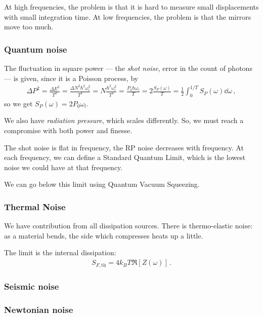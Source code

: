 \documentclass[main.tex]{subfiles}
\begin{document}
At high frequencies, the problem is that it is hard to measure small displacements with small integration time. 
At low frequencies, the problem is that the mirrors move too much. 

\subsubsection{Quantum noise}

The fluctuation in square power --- the \emph{shot noise}, error in the count of photons ---  is given, since it is a Poisson process, by
%
\begin{align}
\Delta P^2 = \frac{\Delta E^2}{T^2} = 
\frac{\Delta N^2 \hbar^2 \omega_{l}^2}{T^2}
= N \frac{\hbar^2   \omega_{l}^2}{T^2}
= \frac{P_0 \hbar \omega_{l}}{T}
= 2\frac{S_P(\omega )}{T}
= \frac{1}{2} \int_{0}^{1/T} S_P (\omega) \dd{\omega }
\,,
\end{align}
%
so we get \(S_P (\omega ) = 2 P_0 \omega_{l}\). 

We also have \emph{radiation pressure}, which scales differently. 
So, we must reach a compromise with both power and finesse. 

The shot noise is flat in frequency, the RP noise decreases with frequency. 
At each frequency, we can define a Standard Quantum Limit, which is the lowest noise we could have at that frequency. 

We can go below this limit using Quantum Vacuum Squeezing. 

\subsubsection{Thermal Noise}

We have contribution from all dissipation sources. 
There is thermo-elastic noise: as a material bends, the side which compresses heats up a little. 

The limit is the internal dissipation: 
%
\begin{align}
S_{F, \text{th}} = 4 k_B T \Re[Z(\omega )]  
\,.
\end{align}

\subsubsection{Seismic noise}

\subsubsection{Newtonian noise}
\end{document}
